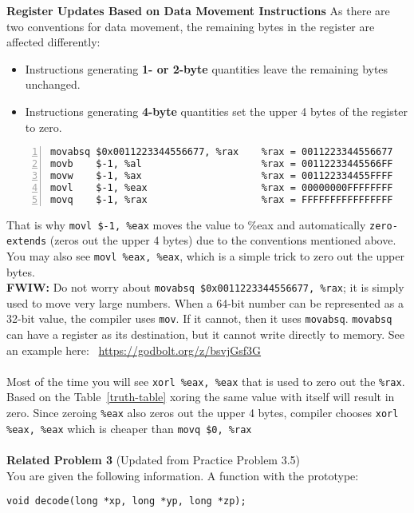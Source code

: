 %
\noindent\textbf{Register Updates Based on Data Movement Instructions}
%
\vspace{5pt}
%
As there are two conventions for data movement, the remaining bytes in the register 
are affected differently:
\begin{itemize}
    \item Instructions generating \textbf{1- or 2-byte} quantities leave the remaining 
    bytes unchanged.
    \item Instructions generating \textbf{4-byte} quantities set the upper 4 bytes of 
    the register to zero.
\end{itemize}
%
\vspace{10pt}
%
\begin{lstlisting}[basicstyle=\ttfamily, frame=none, numbers=left, numberstyle=\color{blue}]
movabsq $0x0011223344556677, %rax    %rax = 0011223344556677
movb    $-1, %al                     %rax = 00112233445566FF
movw    $-1, %ax                     %rax = 001122334455FFFF
movl    $-1, %eax                    %rax = 00000000FFFFFFFF
movq    $-1, %rax                    %rax = FFFFFFFFFFFFFFFF
\end{lstlisting}
%
That is why \texttt{movl \$-1, \%eax} moves the value to \%eax and automatically 
\texttt{zero-extends} (zeros out the upper 4 bytes) due to the conventions mentioned 
above. You may also see \texttt{movl \%eax, \%eax}, which is a simple trick to zero 
out the upper bytes.\\
%
\textbf{FWIW:} Do not worry about \texttt{movabsq \$0x0011223344556677, \%rax}; it is 
simply used to move very large numbers. When a 64-bit number can be represented as a 
32-bit value, the compiler uses \texttt{mov}. If it cannot, then it uses \texttt{movabsq}. 
%
\texttt{movabsq} can have a register as its destination, but it cannot write directly to memory. 
See an example here:
~\url{https://godbolt.org/z/bsvjGsf3G} \\
\\
Most of the time you will see \texttt{xorl \%eax, \%eax} that is used to zero out 
the \texttt{\%rax}. Based on the Table~\ref{truth-table} xoring the same value with 
itself will result in zero. Since zeroing \texttt{\%eax} also zeros out the upper 4 
bytes, compiler chooses \texttt{xorl \%eax, \%eax} which is cheaper than \texttt{movq \$0, \%rax} \\
\\
%
\noindent\textbf{Related Problem 3} (Updated from Practice Problem 3.5) \\
%
\vspace{5pt}
%
You are given the following information. A function with the prototype:
%
\begin{lstlisting}[basicstyle=\ttfamily, frame=none]
void decode(long *xp, long *yp, long *zp);
\end{lstlisting}

